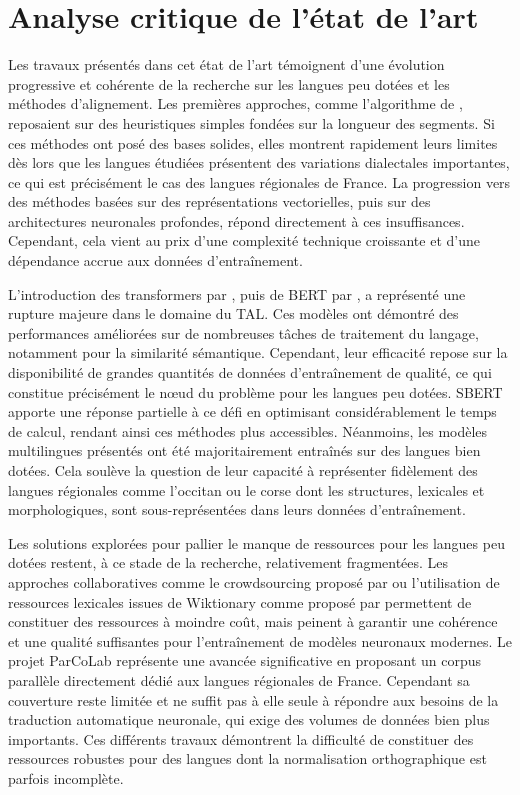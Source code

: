 \chapter{Analyse critique de l'état de l'art}

Les travaux présentés dans cet état de l'art témoignent d'une évolution progressive et cohérente de la
recherche sur les langues peu dotées et les méthodes d'alignement. Les premières approches, comme l'algorithme
de \citet{gale_1991}, reposaient sur des heuristiques simples fondées sur la longueur des segments. Si ces
méthodes ont posé des bases solides, elles montrent rapidement leurs limites dès lors que les langues étudiées
présentent des variations dialectales importantes, ce qui est précisément le cas des langues régionales de
France. La progression vers des méthodes basées sur des représentations vectorielles, puis sur des
architectures neuronales profondes, répond directement à ces insuffisances. Cependant, cela vient au prix d'une complexité
technique croissante et d'une dépendance accrue aux données d'entraînement.

L'introduction des transformers par \citet{vaswani_2017}, puis de BERT par \citet{devlin_2019}, a représenté
une rupture majeure dans le domaine du TAL. Ces modèles ont démontré des performances améliorées sur de
nombreuses tâches de traitement du langage, notamment pour la similarité sémantique. Cependant,
leur efficacité repose sur la disponibilité de grandes quantités de données d'entraînement de qualité,
ce qui constitue précisément le nœud du problème pour les langues peu dotées. SBERT \citep{reimers_2019}
apporte une réponse partielle à ce défi en optimisant considérablement le temps de calcul, rendant ainsi ces
méthodes plus accessibles. Néanmoins, les modèles multilingues présentés ont été
majoritairement entraînés sur des langues bien dotées. Cela soulève la question de leur capacité à
représenter fidèlement des langues régionales comme l'occitan ou le corse dont les structures, lexicales et
morphologiques, sont sous-représentées dans leurs données d'entraînement.

\newpage

Les solutions explorées pour pallier le manque de ressources pour les langues peu dotées restent, à ce stade
de la recherche, relativement fragmentées. Les approches collaboratives comme le crowdsourcing proposé par
\citet{millour_2018} ou l'utilisation de ressources lexicales issues de Wiktionary comme proposé par
\citet{miletic_2018} permettent de constituer des ressources à moindre coût, mais peinent à garantir
une cohérence et une qualité suffisantes pour l'entraînement de modèles neuronaux modernes.
Le projet ParCoLab \citep{stosic_2024} représente une avancée significative en proposant un corpus parallèle
directement dédié aux langues régionales de France. Cependant sa couverture reste limitée et ne suffit pas à
elle seule à répondre aux besoins de la traduction automatique neuronale, qui exige des volumes de données
bien plus importants. Ces différents travaux démontrent la difficulté de constituer des
ressources robustes pour des langues dont la normalisation orthographique est parfois incomplète.

